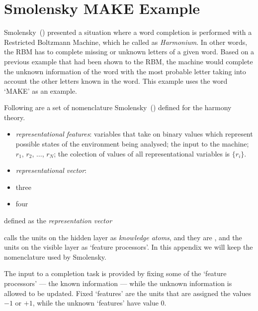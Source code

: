 \section{Smolensky MAKE Example}%
\label{app:smolensky:make}%

Smolensky~(\citeyear{bib:smolensky1986}) presented a situation where a word completion is performed with a Restricted Boltzmann Machine, which he called as \emph{Harmonium}.
In other words, the RBM has to complete missing or unknown letters of a given word. 
Based on a previous example that had been shown to the RBM, the machine would complete the unknown information of the word with the most probable letter taking into account the other letters known in the word.
This example uses the word `MAKE' as an example.

Following are a set of nomenclature Smolensky~(\citeyear{bib:smolensky1986}) defined for the harmony theory.
\begin{itemize}
    \item \emph{representational features}: variables that take on binary values which represent possible states of the environment being analysed; the input to the machine; $r_{1}$, $r_{2}$, $\dots$, $r_{N}$; the colection of values of all representational variables is $\{r_{i}\}$.
    \item \emph{representational vector}: 
    \item three
    \item four
\end{itemize}

defined as the \emph{representation vector}



calls the units on the hidden layer as \emph{knowledge atoms}, and they are , and the units on the visible layer as `feature processors'. In this appendix we will keep the nomenclature used by Smolensky.

The input to a completion task is provided by fixing some of the `feature processors' --- the known information --- while the unknown information is allowed to be updated. Fixed `features' are the units that are assigned the values $-1$ or $+1$, while the unknown `features' have value $0$. 






